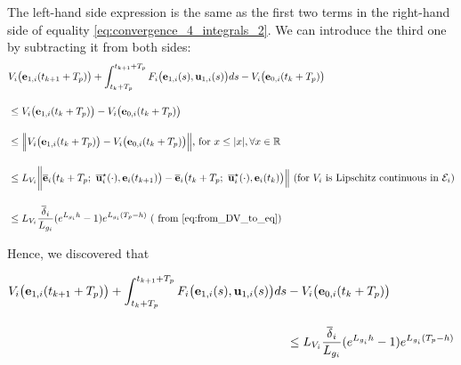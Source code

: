 \begin{gg_box}
  The left-hand side expression is the same as the first two terms in the
  right-hand side of equality \eqref{eq:convergence_4_integrals_2}. We can
  introduce the third one by subtracting it from both sides:
  \begin{align}
    &V_i\big(\vect{e}_{1,i}(t_{k+1} + T_p)\big)
    + \int_{t_k + T_p}^{t_{k+1} + T_p} F_i\big(\vect{e}_{1,i}(s), \vect{u}_{1,i}(s)\big) ds
    - V_i\big(\vect{e}_{0,i}(t_k + T_p)\big) \\[2.5ex]
    &\leq V_i\big(\vect{e}_{1,i}(t_k + T_p)\big)
    - V_i\big(\vect{e}_{0,i}(t_k + T_p)\big) \\[2.5ex]
    &\leq \Big\|V_i\big(\vect{e}_{1,i}(t_k + T_p)\big)
    - V_i\big(\vect{e}_{0,i}(t_k + T_p)\big)\Big\| \text{, for } x \leq |x|, \forall x \in \mathbb{R} \\[2.5ex]
    &\leq L_{V_i}\bigg \|\overline{\vect{e}}_i\big(t_k + T_p;\ \overline{\vect{u}}_i^{\star}(\cdot), \vect{e}_i(t_{k+1})\big)
    - \overline{\vect{e}}_i\big(t_k + T_p;\ \overline{\vect{u}}_i^{\star}(\cdot), \vect{e}_i(t_k) \big)\Big\|
    \text{ (for } V_i \text{ is Lipschitz continuous in } \mathcal{E}_i \text{)} \\[2.5ex]
    &\leq L_{V_i} \dfrac{\overline{\delta}_i}{L_{g_i}} (e^{L_{g_i}h} - 1) e^{L_{g_i} (T_p - h)} \text{ ( from \eqref{eq:from_DV_to_eq})}
  \end{align}
\end{gg_box}
Hence, we discovered that
\begin{bw_box}
\begin{align}
  V_i\big(\bm{\mathbf{e}}_{1,i}(t_{k+1} + T_p)\big)
  + \int_{t_k + T_p}^{t_{k+1} + T_p} F_i\big(\bm{\mathbf{e}}_{1,i}(s), \bm{\mathbf{u}}_{1,i}(s)\big) ds
  &- V_i\big(\bm{\mathbf{e}}_{0,i}(t_k + T_p)\big) \\[2.5ex]
  &\leq L_{V_i}\dfrac{\overline{\delta}_i}{L_{g_i}} (e^{L_{g_i}h} - 1) e^{L_{g_i} (T_p - h)}
  \label{eq:end_result_diff_V_plus_int}
\end{align}
\end{bw_box}

